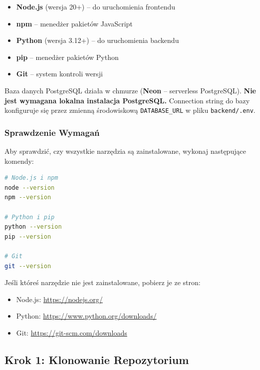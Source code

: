 \documentclass[12pt,a4paper]{article}
\begin{document}
\begin{itemize}
    \item \textbf{Node.js} (wersja 20+) -- do uruchomienia frontendu
    \item \textbf{npm} -- menedżer pakietów JavaScript
    \item \textbf{Python} (wersja 3.12+) -- do uruchomienia backendu
    \item \textbf{pip} -- menedżer pakietów Python
    \item \textbf{Git} -- system kontroli wersji
\end{itemize}

\begin{tcolorbox}[colback=blue!5!white,colframe=blue!75!black,title=\faInfoCircle\ Baza danych]
Baza danych PostgreSQL działa w chmurze (\textbf{Neon} -- serverless PostgreSQL). \textbf{Nie jest wymagana lokalna instalacja PostgreSQL.} Connection string do bazy konfiguruje się przez zmienną środowiskową \texttt{DATABASE\_URL} w pliku \texttt{backend/.env}.
\end{tcolorbox}

\subsubsection{Sprawdzenie Wymagań}

Aby sprawdzić, czy wszystkie narzędzia są zainstalowane, wykonaj następujące komendy:

\begin{lstlisting}[language=bash]
# Node.js i npm
node --version
npm --version

# Python i pip
python --version
pip --version

# Git
git --version
\end{lstlisting}

Jeśli któreś narzędzie nie jest zainstalowane, pobierz je ze stron:
\begin{itemize}
    \item Node.js: \url{https://nodejs.org/}
    \item Python: \url{https://www.python.org/downloads/}
    \item Git: \url{https://git-scm.com/downloads}
\end{itemize}

\subsection{Krok 1: Klonowanie Repozytorium}
\end{document}
